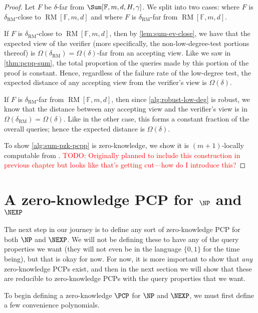 \documentclass[english,12pt]{reedthesis}
\theoremstyle{plain}
\theoremstyle{definition}
\theoremstyle{remark}
\DeclareMathOperator{\RM}{RM}
\newcommand{\TODO}[1]{\textcolor{red}{TODO: #1}}
\begin{document}
\begin{proof}
  Let $F$ be $\delta$-far from $\Sum[\mathbb{F}, m, d, H, \gamma]$. We split into two
  cases: where $F$ is $\delta_{\RM}$-close to $\RM[\mathbb{F}, m, d]$ and where $F$
  is $\delta_{\RM}$-far from $\RM[\mathbb{F}, m, d]$.

  If $F$ is $\delta_{\RM}$-close to $\RM[\mathbb{F}, m, d]$, then by
  \cref{lem:sum-ev-close}, we have that the expected view of the verifier (more
  specifically, the non-low-degree-test portions thereof) is
  $\Omega(\delta_{\RM}) = \Omega(\delta)$-far from an accepting view. Like we saw in
  \cref{thm:pcpp-sum}, the total proportion of the queries made by this portion
  of the proof is constant. Hence, regardless of the failure rate of the
  low-degree test, the expected distance of any accepting view from the
  verifier's view is $\Omega(\delta)$.

  If $F$ is $\delta_{\RM}$-far from $\RM[\mathbb{F}, m, d]$, then since
  \cref{alg:robust-low-deg} is robust, we know that the distance between any
  accepting view and the verifier's view is in $\Omega(\delta_{\RM}) = \Omega(\delta)$. Like in the
  other case, this forms a constant fraction of the overall queries; hence the
  expected distance is $\Omega(\delta)$.

  To show \cref{alg:sum-pzk-pcpp} is zero-knowledge, we show it is
  $(m+1)$-locally computable from \cite[Construction 8.4]{GOS24}.
  \TODO{Originally planned to include this construction in previous chapter but
    looks like that's getting cut---how do I introduce this?}
\end{proof}

\section{A zero-knowledge PCP for $\NP$ and $\NEXP$}\label{sec:pzkpcp-np-nexp}

The next step in our journey is to define any sort of zero-knowledge PCP for
both $\NP$ and $\NEXP$. We will not be defining these to have any of the query
properties we want (they will not even be in the language $\{0, 1\}$ for the
time being), but that is okay for now. For now, it is more important to show
that \emph{any} zero-knowledge PCPs exist, and then in the next section we will
show that these are reducible to zero-knowledge PCPs with the query properties
that we want.

To begin defining a zero-knowledge $\PCP$ for $\NP$ and $\NEXP$, we must first
define a few convenience polynomials.
\end{document}

